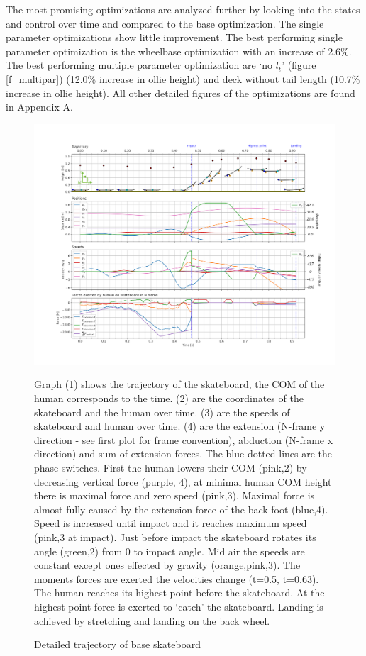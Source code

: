 \documentclass[default,iicol]{sn-jnl}
\begin{document}
{The most promising optimizations are analyzed further by looking into the states and control over time and compared to the base optimization. The single parameter optimizations show little improvement. The best performing single parameter optimization is the wheelbase optimization with an increase of 2.6\%. The best performing multiple parameter optimization are `no $l_t$' (figure \ref{f_multipar}) (12.0\% increase in ollie height) and deck without tail length (10.7\% increase in ollie height).  All other detailed figures of the optimizations are found in Appendix A. 
\begin{figure}
    \includegraphics[trim={0cm 0cm 0cm 0cm},clip,width=\textwidth]{figure/Results/data_basedpi600.png}
    \vspace{-1.5cm}\caption[Trajectory, positions, speeds, and forces of base optimization]{
    Detailed trajectory of base skateboard}\label{f_noparameter}
    Graph (1) shows the trajectory of the skateboard, the COM of the human corresponds to the time. (2) are the coordinates of the skateboard and the human over time. (3) are the speeds of skateboard and human over time. (4) are the extension (N-frame y direction - see first plot for frame convention), abduction (N-frame x direction) and sum of extension forces. The blue dotted lines are the phase switches. First the human lowers their COM (pink,2) by decreasing vertical force (purple, 4), at minimal human COM height there is maximal force and zero speed (pink,3). Maximal force is almost fully caused by the extension force of the back foot (blue,4). Speed is increased until impact and it reaches maximum speed (pink,3 at impact). Just before impact the skateboard rotates its angle (green,2) from 0 to impact angle. Mid air the speeds are constant except ones effected by gravity (orange,pink,3). The moments forces are exerted the velocities change (t=0.5, t=0.63). The human reaches its highest point before the skateboard. At the highest point force is exerted to `catch' the skateboard. Landing is achieved by stretching and landing on the back wheel.
    

\end{figure}}
\end{document}
